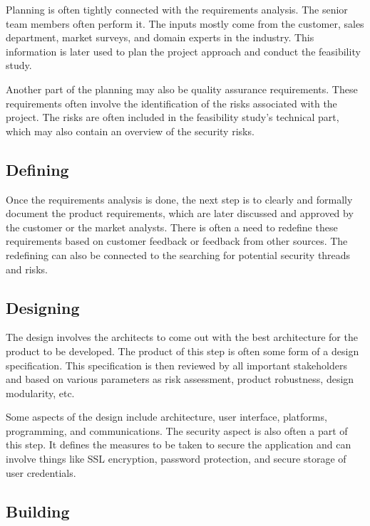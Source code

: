 \documentclass[12pt,a4,twoside]{article}
\begin{document}
Planning is often tightly connected with the requirements analysis. The senior team members often perform it. The inputs mostly come from the customer, sales department, market surveys, and domain experts in the industry. This information is later used to plan the project approach and conduct the feasibility study. \cite{sdlc_tutorials_point}

Another part of the planning may also be quality assurance requirements. These requirements often involve the identification of the risks associated with the project. The risks are often included in the feasibility study's technical part, which may also contain an overview of the security risks. \cite{sdlc_tutorials_point}

\subsection{Defining}

Once the requirements analysis is done, the next step is to clearly and formally document the product requirements, which are later discussed and approved by the customer or the market analysts. There is often a need to redefine these requirements based on customer feedback or feedback from other sources. The redefining can also be connected to the searching for potential security threads and risks. \cite{sdlc_tutorials_point}

\subsection{Designing}

The design involves the architects to come out with the best architecture for the product to be developed. The product of this step is often some form of a design specification. This specification is then reviewed by all important stakeholders and based on various parameters as risk assessment, product robustness, design modularity, etc. \cite{sdlc_tutorials_point}

Some aspects of the design include architecture, user interface, platforms, programming, and communications. The security aspect is also often a part of this step. It defines the measures to be taken to secure the application and can involve things like SSL encryption, password protection, and secure storage of user credentials. \cite{sdlc_phoenix}

\subsection{Building}
\end{document}
